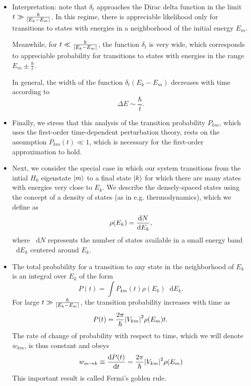 \documentclass[11pt, a4paper]{article}
\newcommand{\diff}{\mathop{}\!\mathrm{d}} %
\begin{document}
\begin{itemize}
    \item Interpretation: note that $ \delta_{t} $ approaches the Dirac delta function in the limit $ t \gg \frac{\hbar}{\abs{E_{k} - E_{m}}} $. In this regime, there is appreciable likelihood only for transitions to states with energies in a neighborhood of the initial energy $ E_{m} $.

    Meanwhile, for $  t \ll \frac{\hbar}{\abs{E_{k} - E_{m}}}  $, the function $ \delta_{t} $ is very wide, which corresponds to appreciable probability for transitions to states with energies in the range $ E_{m} \pm \frac{\hbar}{t} $.

    In general, the width of the function $ \delta_{t}(E_{k} - E_{m}) $ decreases with time according to
    \begin{equation*}
        \Delta E \sim \frac{\hbar}{t}.
    \end{equation*}
    
    \item Finally, we stress that this analysis of the transition probability $ P_{km} $, which uses the first-order time-dependent perturbation theory, rests on the assumption $ P_{km}(t) \ll 1 $, which is necessary for the first-order approximation to hold.

    \item Next, we consider the special case in which our system transitions from the intial $ H_{0} $ eigenstate $ \ket{m} $ to a final state $ \ket{k} $ for which there are many states with energies very close to $ E_{k} $. We describe the densely-spaced states using the concept of a density of states (as in e.g. thermodynamics), which we define as
    \begin{equation*}
        \rho(E_{k}) = \dv{N}{E_{k}},
    \end{equation*}
    where $ \diff N $ represents the number of states available in a small energy band $ \diff E_{k} $ centered around $ E_{k} $. 

    \item The total probability for a transition to any state in the neighborhood of $ E_{k} $ is an integral over $ E_{k} $ of the form
    \begin{equation*}
        P(t) = \int P_{km}(t)\rho(E_{k})\diff E_{k}.
    \end{equation*}
    For large $ t \gg \frac{\hbar}{\abs{E_{k} - E_{m}}} $, the transition probability increases with time as
    \begin{equation*}
        P(t) = \frac{2\pi}{\hbar} \abs{V_{km}}^{2}\rho(E_{m})t.
    \end{equation*}
    The rate of change of probability with respect to time, which we will denote $ w_{km} $, is thus constant and obeys
    \begin{equation*}
        w_{m \to k} \equiv \dv{P(t)}{t} = \frac{2\pi}{\hbar} \abs{V_{km}}^{2}\rho(E_{m})
    \end{equation*}
    This important result is called Fermi's golden rule.
    
\end{itemize}
\end{document}
